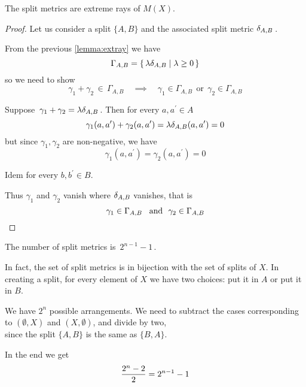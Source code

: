 \documentclass[./main.tex]{subfiles}
\begin{document}
\begin{proposition}
    The split metrics are extreme rays of $M(X)$.\,\footnotemark

\end{proposition}
\begin{proof}
    Let us consider a split $\{A,B\}$ and the associated split metric $\delta_{A,B} \,$.

    From the previous \autoref{lemma:extray} we have
    \[ \Gamma_{A,B} = \{\, \lambda \dAB \mathrel{|} \lambda \geq 0 \,\} \nospblw \]
    so we need to show
    \[ \gamma_1 + \gamma_2 \,\in\, \Gamma_{A,B} \quad \implies \quad \gamma_1 \in \Gamma_{A,B}\ \ \text{or}\ \ \gamma_2 \in \Gamma_{A,B} \]

    Suppose $\, \gamma_1 + \gamma_2 = \lambda \delta_{A,B} \,$. Then for every $a,a^\prime \in A$
    \[ \gamma_1(a,a^\prime) + \gamma_2(a,a^\prime) = \lambda \dAB(a,a^\prime) = 0 \eqspace{2pt}{0pt} \]
    but since $\gamma_1, \gamma_2$ are non-negative, we have
    \[ \gamma_1(a,a^\prime) = \gamma_2(a,a^\prime) = 0 \]

    Idem for every $b,b^\prime \in B$.

    Thus $\gamma_1$ and $\gamma_2$ vanish where $\delta_{A,B}$ vanishes, that is
    \[ \gamma_1 \in \Gamma_{A,B}\ \ \,\text{and}\ \ \gamma_2 \in \Gamma_{A,B} \nospblw \] \qedhere
\end{proof}

\begin{remark}
    The number of split metrics is $\, 2^{n-1} - 1 \,$.\bigskip

    In fact, the set of split metrics is in bijection with the set of splits of $X$. In creating a split, for every element of $X$ we have two choices: put it in $A$ or put it in $B$.

    We have $2^n$ possible arrangements. We need to subtract the cases corresponding to $(\emptyset,X)$ and $(X,\emptyset)$, and divide by two, \\
    since the split $\{A,B\}$ is the same as $\{B,A\}$.

    In the end we get
    \[ \frac{2^n-2}{2} = 2^{n-1} - 1 \nospblw \]
\end{remark}
\end{document}
